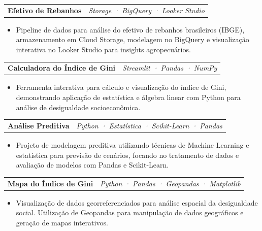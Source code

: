 \documentclass[a4paper,10pt]{article}
\makeatletter
\newcommand{\simpleentry}[2]{%
    \noindent\begin{tabularx}{\textwidth}{@{}>{\raggedright\arraybackslash}X >{\raggedleft\arraybackslash}X@{}}
    \textbf{#1} & \textit{#2} \\
    \end{tabularx}
}
\makeatother
\begin{document}
    \simpleentry{Efetivo de Rebanhos}{Storage · BigQuery · Looker Studio}
        \begin{itemize}
            \item Pipeline de dados para análise do efetivo de rebanhos brasileiros (IBGE), armazenamento em Cloud Storage, modelagem no BigQuery e visualização interativa no Looker Studio para insights agropecuários.
        \end{itemize}

    \simpleentry{Calculadora do Índice de Gini}{Streamlit · Pandas · NumPy}
        \begin{itemize}
            \item Ferramenta interativa para cálculo e visualização do índice de Gini, demonstrando aplicação de estatística e álgebra linear com Python para análise de desigualdade socioeconômica.
        \end{itemize}

    \simpleentry{Análise Preditiva}{Python · Estatística · Scikit-Learn · Pandas}
        \begin{itemize}
            \item Projeto de modelagem preditiva utilizando técnicas de Machine Learning e estatística para previsão de cenários, focando no tratamento de dados e avaliação de modelos com Pandas e Scikit-Learn.
        \end{itemize}

    \simpleentry{Mapa do Índice de Gini}{Python · Pandas · Geopandas · Matplotlib}
        \begin{itemize}
            \item Visualização de dados georreferenciados para análise espacial da desigualdade social. Utilização de Geopandas para manipulação de dados geográficos e geração de mapas interativos.
        \end{itemize}
\end{document}
